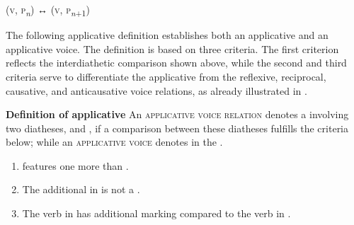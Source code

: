 \ea
	 (\textsc{v}, \textsc{p}\textsubscript{\textit{n}}) ↔  (\textsc{v}, \textsc{p}\textsubscript{\textit{n}+1})
\z

\smallskip

The following applicative definition establishes both an applicative  and an applicative voice. The definition is based on three criteria. The first criterion reflects the interdiathetic comparison shown above, while the second and third criteria serve to differentiate the applicative  from the reflexive, reciprocal, causative, and anticausative voice relations, as already illustrated in . 

\eanoraggedright
		\textbf{Definition of applicative} \newline
		An \textsc{applicative voice relation} denotes a  involving two diatheses,  and , if a comparison between these diatheses fulfills the criteria below; while an \textsc{applicative voice} denotes  in the .
		\begin{enumerate}[label=\roman*)]
			\item {} features one  more than .
			\item The additional  in  is not a .
			\item The verb in  has additional marking compared to the verb in .
		\end{enumerate}
\z

